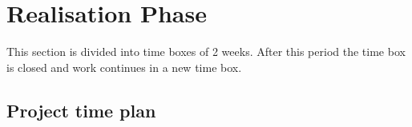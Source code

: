 \chapter{Realisation Phase}
This section is divided into time boxes of 2 weeks. After this period the time box is closed and work continues in a new time box. 
\section{Project time plan}

